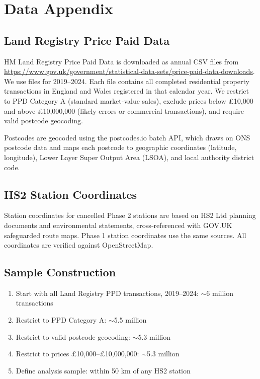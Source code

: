 \documentclass[12pt]{article}
\begin{document}
\label{apep_main_text_end}
\newpage


\newpage
\appendix

\section{Data Appendix}

\subsection{Land Registry Price Paid Data}

HM Land Registry Price Paid Data is downloaded as annual CSV files from \url{https://www.gov.uk/government/statistical-data-sets/price-paid-data-downloads}. We use files for 2019--2024. Each file contains all completed residential property transactions in England and Wales registered in that calendar year. We restrict to PPD Category A (standard market-value sales), exclude prices below \pounds10,000 and above \pounds10,000,000 (likely errors or commercial transactions), and require valid postcode geocoding.

Postcodes are geocoded using the postcodes.io batch API, which draws on ONS postcode data and maps each postcode to geographic coordinates (latitude, longitude), Lower Layer Super Output Area (LSOA), and local authority district code.

\subsection{HS2 Station Coordinates}

Station coordinates for cancelled Phase 2 stations are based on HS2 Ltd planning documents and environmental statements, cross-referenced with GOV.UK safeguarded route maps. Phase 1 station coordinates use the same sources. All coordinates are verified against OpenStreetMap.

\subsection{Sample Construction}

\begin{enumerate}
\item Start with all Land Registry PPD transactions, 2019--2024: $\sim$6 million transactions
\item Restrict to PPD Category A: $\sim$5.5 million
\item Restrict to valid postcode geocoding: $\sim$5.3 million
\item Restrict to prices \pounds10,000--\pounds10,000,000: $\sim$5.3 million
\item Define analysis sample: within 50 km of any HS2 station
\end{enumerate}
\end{document}
